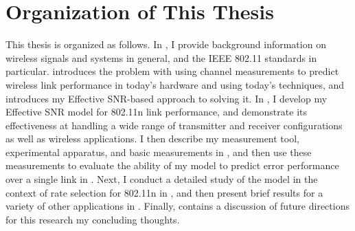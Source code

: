 \section{Organization of This Thesis}
\label{sec:intro_organization}
This thesis is organized as follows. In , I provide background information on wireless signals and systems in general, and the IEEE 802.11 standards in particular.  introduces the problem with using channel measurements to predict wireless link performance in today's hardware and using today's techniques, and introduces my Effective SNR-based approach to solving it. In , I develop my Effective SNR model for 802.11n link performance, and demonstrate its effectiveness at handling a wide range of transmitter and receiver configurations as well as wireless applications. I then describe my measurement tool, experimental apparatus, and basic measurements in , and then use these measurements to evaluate the ability of my model to predict error performance over a single link in . Next, I conduct a detailed study of the model in the context of rate selection for 802.11n in , and then present brief results for a variety of other applications in . Finally,  contains a discussion of future directions for this research my concluding thoughts.

\ifx\mainfile\undefined

\fi
